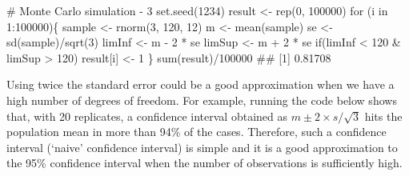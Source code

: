 \documentclass[a4paper,12pt,oneside]{book}
\newenvironment{Shaded}{\begin{snugshade}}{\end{snugshade}}
\newcommand{\DecValTok}[1]{#1}
\newcommand{\SpecialCharTok}[1]{#1}
\newcommand{\CommentTok}[1]{#1}
\newcommand{\DocumentationTok}[1]{#1}
\newcommand{\OtherTok}[1]{#1}
\newcommand{\FunctionTok}[1]{#1}
\newcommand{\ControlFlowTok}[1]{#1}
\newcommand{\NormalTok}[1]{#1}
\begin{document}
\begin{Shaded}
\begin{Highlighting}[]
\CommentTok{\# Monte Carlo simulation {-} 3}
\FunctionTok{set.seed}\NormalTok{(}\DecValTok{1234}\NormalTok{)}
\NormalTok{result }\OtherTok{\textless{}{-}} \FunctionTok{rep}\NormalTok{(}\DecValTok{0}\NormalTok{, }\DecValTok{100000}\NormalTok{)}
\ControlFlowTok{for}\NormalTok{ (i }\ControlFlowTok{in} \DecValTok{1}\SpecialCharTok{:}\DecValTok{100000}\NormalTok{)\{}
\NormalTok{  sample }\OtherTok{\textless{}{-}} \FunctionTok{rnorm}\NormalTok{(}\DecValTok{3}\NormalTok{, }\DecValTok{120}\NormalTok{, }\DecValTok{12}\NormalTok{)}
\NormalTok{  m }\OtherTok{\textless{}{-}} \FunctionTok{mean}\NormalTok{(sample)}
\NormalTok{  se }\OtherTok{\textless{}{-}} \FunctionTok{sd}\NormalTok{(sample)}\SpecialCharTok{/}\FunctionTok{sqrt}\NormalTok{(}\DecValTok{3}\NormalTok{)}
\NormalTok{  limInf }\OtherTok{\textless{}{-}}\NormalTok{ m }\SpecialCharTok{{-}} \DecValTok{2} \SpecialCharTok{*}\NormalTok{ se}
\NormalTok{  limSup }\OtherTok{\textless{}{-}}\NormalTok{ m }\SpecialCharTok{+} \DecValTok{2} \SpecialCharTok{*}\NormalTok{ se}
  \ControlFlowTok{if}\NormalTok{(limInf }\SpecialCharTok{\textless{}} \DecValTok{120} \SpecialCharTok{\&}\NormalTok{ limSup }\SpecialCharTok{\textgreater{}} \DecValTok{120}\NormalTok{) result[i] }\OtherTok{\textless{}{-}} \DecValTok{1}
\NormalTok{\}}
\FunctionTok{sum}\NormalTok{(result)}\SpecialCharTok{/}\DecValTok{100000}
\DocumentationTok{\#\# [1] 0.81708}
\end{Highlighting}
\end{Shaded}

Using twice the standard error could be a good approximation when we have a high number of degrees of freedom. For example, running the code below shows that, with 20 replicates, a confidence interval obtained as \(m \pm 2 \times s/\sqrt{3}\) hits the population mean in more than 94\% of the cases. Therefore, such a confidence interval (`naive' confidence interval) is simple and it is a good approximation to the 95\% confidence interval when the number of observations is sufficiently high.
\end{document}
